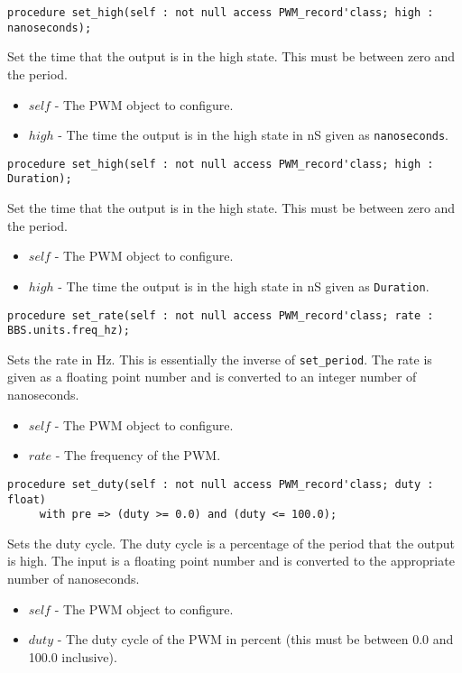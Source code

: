 \documentclass[10pt, openany]{book}
\newcommand{\indexfunc}[1]{\index[func]{#1}}
\newcommand{\function}[1]{\texttt{#1}}
\newcommand{\datatype}[1]{\texttt{#1}}
\begin{document}
\begin{lstlisting}
procedure set_high(self : not null access PWM_record'class; high : nanoseconds);
\end{lstlisting}
\indexfunc{set\_high}
Set the time that the output is in the high state.  This must be between zero and the period.
\begin{itemize}
  \item $self$ - The PWM object to configure.
  \item $high$ - The time the output is in the high state in nS given as \datatype{nanoseconds}.
\end{itemize}

\begin{lstlisting}
procedure set_high(self : not null access PWM_record'class; high : Duration);
\end{lstlisting}
\indexfunc{set\_high}
Set the time that the output is in the high state.  This must be between zero and the period.
\begin{itemize}
  \item $self$ - The PWM object to configure.
  \item $high$ - The time the output is in the high state in nS given as \datatype{Duration}.
\end{itemize}

\begin{lstlisting}
procedure set_rate(self : not null access PWM_record'class; rate : BBS.units.freq_hz);
\end{lstlisting}
\indexfunc{set\_rate}
Sets the rate in Hz.  This is essentially the inverse of \function{set\_period}.  The rate is given as a floating point number and is converted to an integer number of nanoseconds.
\begin{itemize}
  \item $self$ - The PWM object to configure.
  \item $rate$ - The frequency of the PWM.
\end{itemize}

\begin{lstlisting}
procedure set_duty(self : not null access PWM_record'class; duty : float)
     with pre => (duty >= 0.0) and (duty <= 100.0);
\end{lstlisting}
\indexfunc{set\_duty}
Sets the duty cycle.  The duty cycle is a percentage of the period that the output is high.  The input is a floating point number and is converted to the appropriate number of nanoseconds.
\begin{itemize}
  \item $self$ - The PWM object to configure.
  \item $duty$ - The duty cycle of the PWM in percent (this must be between 0.0 and 100.0 inclusive).
\end{itemize}
\end{document}
